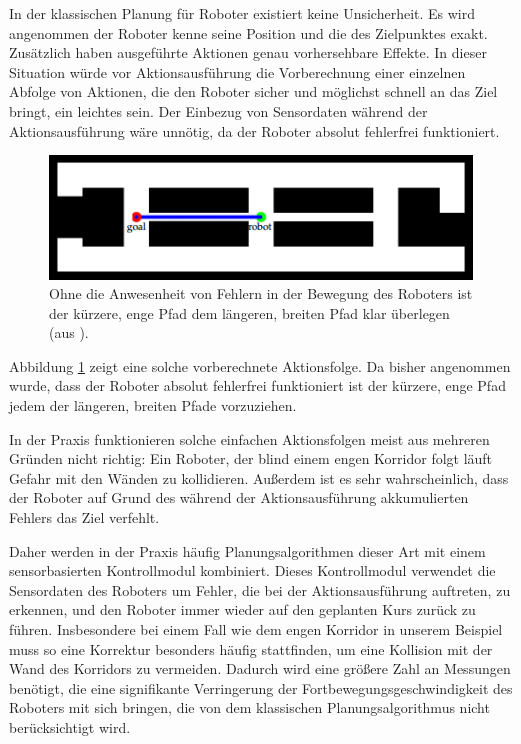 \documentclass[a4paper]{IEEEtran}
\begin{document}
In der klassischen Planung für Roboter existiert keine Unsicherheit. Es wird angenommen der Roboter kenne seine Position und die des Zielpunktes exakt. Zusätzlich haben ausgeführte Aktionen genau vorhersehbare Effekte. In dieser Situation würde vor Aktionsausführung die Vorberechnung einer einzelnen Abfolge von Aktionen, die den Roboter sicher und möglichst schnell an das Ziel bringt, ein leichtes sein. Der Einbezug von Sensordaten während der Aktionsausführung wäre unnötig, da der Roboter absolut fehlerfrei funktioniert.

\begin{figure}[ht]
	\centering
	\includegraphics[scale=0.72]{images/autnmRobot_directPath.png}
	\caption{Ohne die Anwesenheit von Fehlern in der Bewegung des Roboters ist der kürzere, enge Pfad dem längeren, breiten Pfad klar überlegen (aus \cite{thrun2005probabilistic}).}
	\label{fig:autnmRob_dirPath}
\end{figure}

Abbildung \ref{fig:autnmRob_dirPath} zeigt eine solche vorberechnete Aktionsfolge. Da bisher angenommen wurde, dass der Roboter absolut fehlerfrei funktioniert ist der kürzere, enge Pfad jedem der längeren, breiten Pfade vorzuziehen.

In der Praxis funktionieren solche einfachen Aktionsfolgen meist aus mehreren Gründen nicht richtig: Ein Roboter, der blind einem engen Korridor folgt läuft Gefahr mit den Wänden zu kollidieren. Außerdem ist es sehr wahrscheinlich, dass der Roboter auf Grund des während der Aktionsausführung akkumulierten Fehlers das Ziel verfehlt.

Daher werden in der Praxis häufig Planungsalgorithmen dieser Art mit einem sensorbasierten Kontrollmodul kombiniert. Dieses Kontrollmodul verwendet die Sensordaten des Roboters um Fehler, die bei der Aktionsausführung auftreten, zu erkennen, und den Roboter immer wieder auf den geplanten Kurs zurück zu führen. Insbesondere bei einem Fall wie dem engen Korridor in unserem Beispiel muss so eine Korrektur besonders häufig stattfinden, um eine Kollision mit der Wand des Korridors zu vermeiden. Dadurch wird eine größere Zahl an Messungen benötigt, die eine signifikante Verringerung der Fortbewegungsgeschwindigkeit des Roboters mit sich bringen, die von dem klassischen Planungsalgorithmus nicht berücksichtigt wird. 
\end{document}
